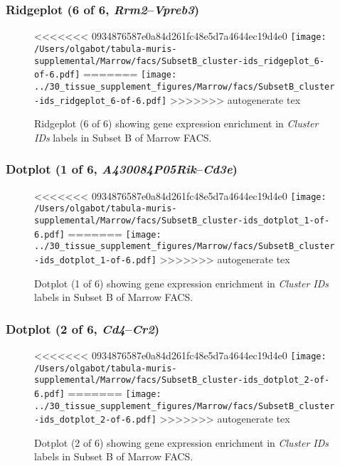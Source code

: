 \clearpage

\subsubsection{Ridgeplot (6 of 6, \emph{Rrm2}--\emph{Vpreb3})}
\begin{figure}[h]
\centering
<<<<<<< 0934876587e0a84d261fc48e5d7a4644ec19d4e0
\texttt{[image: /Users/olgabot/tabula-muris-supplemental/Marrow/facs/SubsetB\_cluster-ids\_ridgeplot\_6-of-6.pdf]}
=======
\texttt{[image: ../30\_tissue\_supplement\_figures/Marrow/facs/SubsetB\_cluster-ids\_ridgeplot\_6-of-6.pdf]}
>>>>>>> autogenerate tex

\caption{ Ridgeplot (6 of 6)  showing gene expression enrichment in \emph{Cluster IDs} labels in Subset B of Marrow FACS. }
\end{figure}


\clearpage

\subsubsection{Dotplot (1 of 6, \emph{A430084P05Rik}--\emph{Cd3e})}
\begin{figure}[h]
\centering
<<<<<<< 0934876587e0a84d261fc48e5d7a4644ec19d4e0
\texttt{[image: /Users/olgabot/tabula-muris-supplemental/Marrow/facs/SubsetB\_cluster-ids\_dotplot\_1-of-6.pdf]}
=======
\texttt{[image: ../30\_tissue\_supplement\_figures/Marrow/facs/SubsetB\_cluster-ids\_dotplot\_1-of-6.pdf]}
>>>>>>> autogenerate tex

\caption{ Dotplot (1 of 6)  showing gene expression enrichment in \emph{Cluster IDs} labels in Subset B of Marrow FACS. }
\end{figure}


\clearpage

\subsubsection{Dotplot (2 of 6, \emph{Cd4}--\emph{Cr2})}
\begin{figure}[h]
\centering
<<<<<<< 0934876587e0a84d261fc48e5d7a4644ec19d4e0
\texttt{[image: /Users/olgabot/tabula-muris-supplemental/Marrow/facs/SubsetB\_cluster-ids\_dotplot\_2-of-6.pdf]}
=======
\texttt{[image: ../30\_tissue\_supplement\_figures/Marrow/facs/SubsetB\_cluster-ids\_dotplot\_2-of-6.pdf]}
>>>>>>> autogenerate tex

\caption{ Dotplot (2 of 6)  showing gene expression enrichment in \emph{Cluster IDs} labels in Subset B of Marrow FACS. }
\end{figure}


